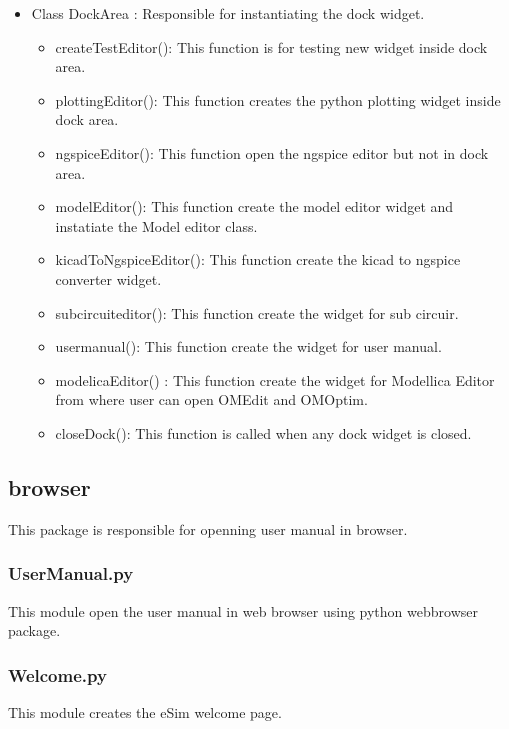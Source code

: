 \documentclass[12pt]{article}
\begin{document}
\begin{itemize}
	\item Class DockArea : Responsible for instantiating the dock widget.
	\begin{itemize}
		\item createTestEditor(): This function is for testing new widget inside dock area.
		\item plottingEditor(): This function creates the python plotting widget inside dock area.
		\item ngspiceEditor(): This function open the ngspice editor but not in dock area.
		\item modelEditor(): This function create the model editor widget and instatiate the Model editor class.
		\item kicadToNgspiceEditor(): This function create the kicad to ngspice converter widget.
		\item subcircuiteditor(): This function create the widget for sub circuir.
		\item usermanual(): This function create the widget for user manual.
		\item modelicaEditor() : This function create the widget for Modellica Editor from where user can open OMEdit and OMOptim.
		\item closeDock(): This function is called when any dock widget is closed.
		
	\end{itemize}

\end{itemize}
\newpage

\subsection{browser}
This package is responsible for openning user manual in browser.

\subsubsection{UserManual.py}
This module open the user manual in web browser using python webbrowser package.

\subsubsection{Welcome.py}
This module creates the eSim welcome page.
\end{document}

